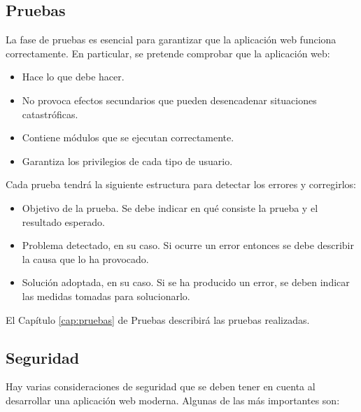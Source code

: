 \subsection{Pruebas}

La fase de pruebas es esencial para garantizar que la aplicación web funciona correctamente. En particular, se pretende comprobar que la aplicación web:
\begin{itemize}
    \item Hace lo que debe hacer.
    \item No provoca efectos secundarios que pueden desencadenar situaciones catastróficas.
    \item Contiene módulos que se ejecutan correctamente.
    \item Garantiza los privilegios de cada tipo de usuario.
\end{itemize}

Cada prueba tendrá la siguiente estructura para detectar los errores y corregirlos:
\begin{itemize}
    \item Objetivo de la prueba. Se debe indicar en qué consiste la prueba y el resultado esperado.
    \item Problema detectado, en su caso. Si ocurre un error entonces se debe describir la causa que lo ha provocado.
    \item Solución adoptada, en su caso. Si se ha producido un error, se deben indicar las medidas tomadas para solucionarlo.
\end{itemize}

El Capítulo \ref{cap:pruebas} de Pruebas describirá las pruebas realizadas.

\subsection{Seguridad}

Hay varias consideraciones de seguridad que se deben tener en cuenta al desarrollar una aplicación web moderna. Algunas de las más importantes son:

